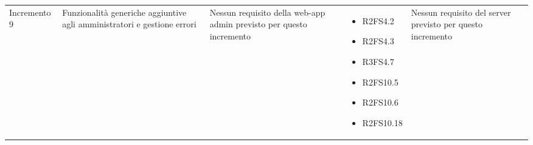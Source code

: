 {\begin{longtable}{C{2.5cm} C{3.2cm} C{2.8cm} C{2.8cm} C{2.8cm}}
Incremento 9 & Funzionalità generiche aggiuntive agli amministratori e gestione errori & 
    Nessun requisito della web-app admin previsto per questo incremento
     & \begin{itemize} 
    \item[ ] R2FS4.2
    \item[ ] R2FS4.3
    \item[ ] R3FS4.7
    \item[ ] R2FS10.5
    \item[ ] R2FS10.6
    \item[ ] R2FS10.18
\end{itemize} & 
    Nessun requisito del server previsto per questo incremento \\

\end{longtable}
}